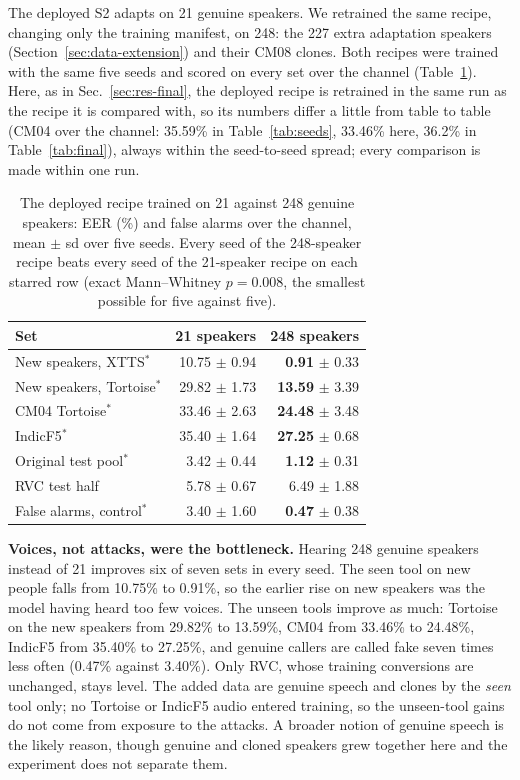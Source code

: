 The deployed S2 adapts on 21 genuine speakers. We retrained the same recipe, changing
only the training manifest, on 248: the 227 extra adaptation speakers
(Section~\ref{sec:data-extension}) and their CM08 clones. Both recipes were trained with
the same five seeds and scored on every set over the channel (Table~\ref{tab:speakers248}).
Here, as in Sec.~\ref{sec:res-final}, the deployed recipe is retrained in the same run as the
recipe it is compared with, so its numbers differ a little from table to table (CM04 over the
channel: 35.59\% in Table~\ref{tab:seeds}, 33.46\% here, 36.2\% in Table~\ref{tab:final}),
always within the seed-to-seed spread; every comparison is made within one run.

\begin{table}[t]
\centering
\caption{The deployed recipe trained on 21 against 248 genuine speakers: EER (\%) and
false alarms over the channel, mean $\pm$ sd over five seeds. Every seed of the
248-speaker recipe beats every seed of the 21-speaker recipe on each starred row
(exact Mann--Whitney $p = 0.008$, the smallest possible for five against five).}
\label{tab:speakers248}
\small
\begin{tabular}{@{}lrr@{}}
\toprule
Set & 21 speakers & 248 speakers \\
\midrule
New speakers, XTTS$^*$       & 10.75 $\pm$ 0.94 & \textbf{0.91} $\pm$ 0.33 \\
New speakers, Tortoise$^*$   & 29.82 $\pm$ 1.73 & \textbf{13.59} $\pm$ 3.39 \\
CM04 Tortoise$^*$            & 33.46 $\pm$ 2.63 & \textbf{24.48} $\pm$ 3.48 \\
IndicF5$^*$                  & 35.40 $\pm$ 1.64 & \textbf{27.25} $\pm$ 0.68 \\
Original test pool$^*$       & 3.42 $\pm$ 0.44  & \textbf{1.12} $\pm$ 0.31 \\
RVC test half                & 5.78 $\pm$ 0.67  & 6.49 $\pm$ 1.88 \\
False alarms, control$^*$    & 3.40 $\pm$ 1.60  & \textbf{0.47} $\pm$ 0.38 \\
\bottomrule
\end{tabular}
\end{table}

\textbf{Voices, not attacks, were the bottleneck.} Hearing 248 genuine speakers instead
of 21 improves six of seven sets in every seed. The seen tool on new people falls from
10.75\% to 0.91\%, so the earlier rise on new speakers was the model having heard too
few voices. The unseen tools improve as much: Tortoise on the new speakers from 29.82\%
to 13.59\%, CM04 from 33.46\% to 24.48\%, IndicF5 from 35.40\% to 27.25\%, and genuine
callers are called fake seven times less often (0.47\% against 3.40\%). Only RVC, whose
training conversions are unchanged, stays level. The added data are genuine speech and
clones by the \emph{seen} tool only; no Tortoise or IndicF5 audio entered training, so
the unseen-tool gains do not come from exposure to the attacks. A broader notion of genuine
speech is the likely reason, though genuine and cloned speakers grew together here and the
experiment does not separate them.

